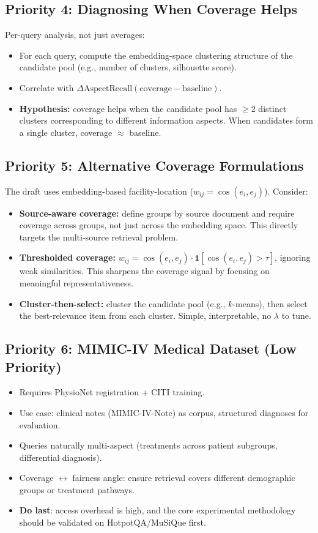 \documentclass[11pt,a4paper]{article}
\begin{document}
\subsection{Priority 4: Diagnosing When Coverage Helps}

Per-query analysis, not just averages:
\begin{itemize}[leftmargin=*]
	\item For each query, compute the embedding-space clustering structure of the candidate pool (e.g., number of clusters, silhouette score).
	\item Correlate with $\Delta\text{AspectRecall}(\text{coverage} - \text{baseline})$.
	\item \textbf{Hypothesis:} coverage helps when the candidate pool has $\geq 2$ distinct clusters corresponding to different information aspects. When candidates form a single cluster, coverage $\approx$ baseline.
\end{itemize}

\subsection{Priority 5: Alternative Coverage Formulations}

The draft uses embedding-based facility-location ($w_{ij} = \cos(e_i, e_j)$). Consider:
\begin{itemize}[leftmargin=*]
	\item \textbf{Source-aware coverage:} define groups by source document and require coverage across groups, not just across the embedding space. This directly targets the multi-source retrieval problem.
	\item \textbf{Thresholded coverage:} $w_{ij} = \cos(e_i, e_j) \cdot \mathbf{1}[\cos(e_i, e_j) > \tau]$, ignoring weak similarities. This sharpens the coverage signal by focusing on meaningful representativeness.
	\item \textbf{Cluster-then-select:} cluster the candidate pool (e.g., $k$-means), then select the best-relevance item from each cluster. Simple, interpretable, no $\lambda$ to tune.
\end{itemize}

\subsection{Priority 6: MIMIC-IV Medical Dataset (Low Priority)}

\begin{itemize}[leftmargin=*]
	\item Requires PhysioNet registration + CITI training.
	\item Use case: clinical notes (MIMIC-IV-Note) as corpus, structured diagnoses for evaluation.
	\item Queries naturally multi-aspect (treatments across patient subgroups, differential diagnosis).
	\item Coverage $\leftrightarrow$ fairness angle: ensure retrieval covers different demographic groups or treatment pathways.
	\item \textbf{Do last}: access overhead is high, and the core experimental methodology should be validated on HotpotQA/MuSiQue first.
\end{itemize}

\newpage
\end{document}
